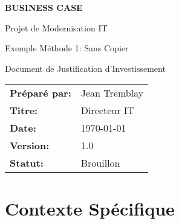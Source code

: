





\begin{titlepage}
\dollaramalogo[0.6]

\vspace{2cm}

\begin{center}
{\Huge\bfseries\color{DollaramaGreen} BUSINESS CASE}

\vspace{1cm}

{\Large\color{DollaramaGreen} Projet de Modernisation IT}

\vspace{0.5cm}

{\large\color{DollaramaGreen} Exemple Méthode 1: Sans Copier}

\vspace{2cm}

{\large Document de Justification d'Investissement}

\vspace{3cm}

\begin{tabular}{ll}
\textbf{Préparé par:} & Jean Tremblay \\
\textbf{Titre:} & Directeur IT \\
\textbf{Date:} & \today \\
\textbf{Version:} & 1.0 \\
\textbf{Statut:} & Brouillon
\end{tabular}

\vfill

\dollaramalogo[0.4]
\end{center}
\end{titlepage}

\tableofcontents
\clearpage



\section{Contexte Spécifique}

